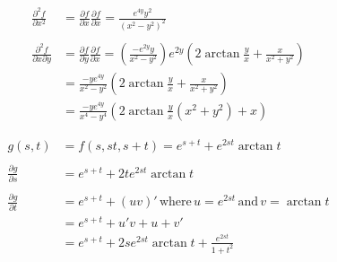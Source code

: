 \documentclass[a4paper,norsk,12pt]{article}
\begin{document}
\begin{align*}
  \frac{\partial^2 f}{\partial x^2} &= \frac{\partial f}{\partial x} \frac{\partial f}{\partial x} 
    = \frac{e^{4y}y^2}{(x^2-y^2)^2} \\
  \\
  \frac{\partial^2 f}{\partial x \partial y} &=
    \frac{\partial f}{\partial y} \frac{\partial f}{\partial x} =
    \left(\frac{-e^{2y}y}{x^2-y^2}\right) e^{2y}\left( 2\arctan{\frac{y}{x}} + \frac{x}{x^2+y^2} \right) \\
  &= \frac{-ye^{4y}}{x^2-y^2}
          \left(
            2\arctan{\frac{y}{x}} + \frac{x}{x^2+y^2}
          \right) \\
  &= \frac{-ye^{4y}}{x^4-y^4}
          \left(
            2\arctan{\frac{y}{x}}(x^2+y^2) + x
          \right)
\end{align*}

\begin{align*}
  g(s,t) &= f(s, st, s+t) = e^{s+t} + e^{2st}\arctan{t} \\
  \\
  \frac{\partial g}{\partial s} &= e^{s+t} + 2te^{2st}\arctan{t} \\
  \\
  \frac{\partial g}{\partial t} &= e^{s+t} + (uv)' \,\text{where}\, u=e^{2st}
    \,\text{and}\, v=\arctan{t} \\
    &= e^{s+t} + u'v + u+v' \\
    &= e^{s+t} + 2se^{2st}\arctan{t} + \frac{e^{2st}}{1+t^2}
\end{align*}
\end{document}
